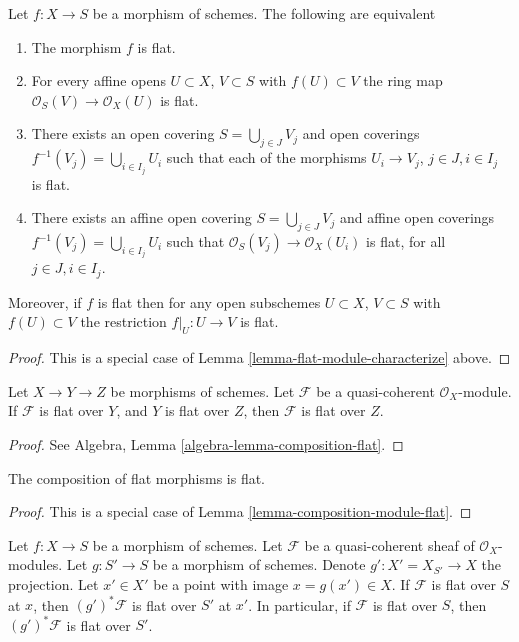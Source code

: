 \begin{lemma}
\label{lemma-flat-characterize}
Let $f : X \to S$ be a morphism of schemes.
The following are equivalent
\begin{enumerate}
\item The morphism $f$ is flat.
\item For every affine opens $U \subset X$, $V \subset S$
with $f(U) \subset V$ the ring map
$\mathcal{O}_S(V) \to \mathcal{O}_X(U)$ is flat.
\item There exists an open covering $S = \bigcup_{j \in J} V_j$
and open coverings $f^{-1}(V_j) = \bigcup_{i \in I_j} U_i$ such
that each of the morphisms $U_i \to V_j$, $j\in J, i\in I_j$
is flat.
\item There exists an affine open covering $S = \bigcup_{j \in J} V_j$
and affine open coverings $f^{-1}(V_j) = \bigcup_{i \in I_j} U_i$ such
that $\mathcal{O}_S(V_j) \to \mathcal{O}_X(U_i)$ is flat, for all
$j\in J, i\in I_j$.
\end{enumerate}
Moreover, if $f$ is flat then for
any open subschemes $U \subset X$, $V \subset S$ with $f(U) \subset V$
the restriction $f|_U : U \to V$ is flat.
\end{lemma}

\begin{proof}
This is a special case of Lemma \ref{lemma-flat-module-characterize}
above.
\end{proof}

\begin{lemma}
\label{lemma-composition-module-flat}
Let $X \to Y \to Z$ be morphisms of schemes.
Let $\mathcal{F}$ be a quasi-coherent $\mathcal{O}_X$-module.
If $\mathcal{F}$ is flat over $Y$, and $Y$ is flat over $Z$, then
$\mathcal{F}$ is flat over $Z$.
\end{lemma}

\begin{proof}
See Algebra, Lemma \ref{algebra-lemma-composition-flat}.
\end{proof}

\begin{lemma}
\label{lemma-composition-flat}
The composition of flat morphisms is flat.
\end{lemma}

\begin{proof}
This is a special case of Lemma \ref{lemma-composition-module-flat}.
\end{proof}

\begin{lemma}
\label{lemma-base-change-module-flat}
Let $f : X \to S$ be a morphism of schemes.
Let $\mathcal{F}$ be a quasi-coherent sheaf of $\mathcal{O}_X$-modules.
Let $g : S' \to S$ be a morphism of schemes.
Denote $g' : X' = X_{S'} \to X$ the projection.
Let $x' \in X'$ be a point with image $x = g(x') \in X$.
If $\mathcal{F}$ is flat over $S$ at $x$, then
$(g')^*\mathcal{F}$ is flat over $S'$ at $x'$.
In particular, if $\mathcal{F}$ is flat over $S$, then
$(g')^*\mathcal{F}$ is flat over $S'$.
\end{lemma}

